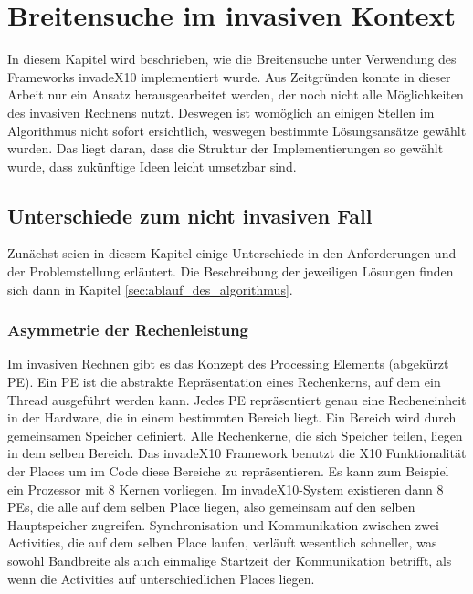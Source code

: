 
\chapter{Breitensuche im invasiven Kontext} %
\label{cha:breitensuche_im_invasiven_kontext}
In diesem Kapitel wird beschrieben, wie die Breitensuche unter Verwendung des Frameworks invadeX10 implementiert wurde. Aus Zeitgründen konnte in dieser Arbeit nur ein Ansatz herausgearbeitet werden, der noch nicht alle Möglichkeiten des invasiven Rechnens nutzt. Deswegen ist womöglich an einigen Stellen im Algorithmus nicht sofort ersichtlich, weswegen bestimmte Lösungsansätze gewählt wurden. Das liegt daran, dass die Struktur der Implementierungen so gewählt wurde, dass zukünftige Ideen leicht umsetzbar sind.

\section{Unterschiede zum nicht invasiven Fall} %
\label{sec:unterschiede_zum_nicht_invasiven_fall}
Zunächst seien in diesem Kapitel einige Unterschiede in den Anforderungen und der Problemstellung erläutert. Die Beschreibung der jeweiligen Lösungen finden sich dann in Kapitel \ref{sec:ablauf_des_algorithmus}.

\subsection{Asymmetrie der Rechenleistung} %
\label{sub:asymmetrie_der_rechenleistung}
Im invasiven Rechnen gibt es das Konzept des Processing Elements (abgekürzt PE). Ein PE ist die abstrakte Repräsentation eines Rechenkerns, auf dem ein Thread ausgeführt werden kann. Jedes PE repräsentiert genau eine Recheneinheit in der Hardware, die in einem bestimmten Bereich liegt. Ein Bereich wird durch gemeinsamen Speicher definiert. Alle Rechenkerne, die sich Speicher teilen, liegen in dem selben Bereich. Das invadeX10 Framework benutzt die X10 Funktionalität der Places um im Code diese Bereiche zu repräsentieren. Es kann zum Beispiel ein Prozessor mit 8 Kernen vorliegen. Im invadeX10-System existieren dann 8 PEs, die alle auf dem selben Place liegen, also gemeinsam auf den selben Hauptspeicher zugreifen. Synchronisation und Kommunikation zwischen zwei Activities, die auf dem selben Place laufen, verläuft wesentlich schneller, was sowohl Bandbreite als auch einmalige Startzeit der Kommunikation betrifft, als wenn die Activities auf unterschiedlichen Places liegen. 

